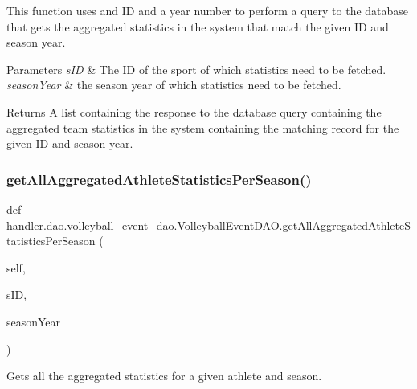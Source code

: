 This function uses and ID and a year number to perform a query to the database that gets the aggregated statistics in the system that match the given ID and season year.


\begin{DoxyParams}{Parameters}
{\em s\+ID} & The ID of the sport of which statistics need to be fetched. \\
\hline
{\em season\+Year} & the season year of which statistics need to be fetched.\\
\hline
\end{DoxyParams}
\begin{DoxyReturn}{Returns}
A list containing the response to the database query containing the aggregated team statistics in the system containing the matching record for the given ID and season year. 
\end{DoxyReturn}
\mbox{\label{classhandler_1_1dao_1_1volleyball__event__dao_1_1_volleyball_event_d_a_o_a163a639d8d5ec7cc4863c7512fea63c5}} 
\subsubsection{\texorpdfstring{get\+All\+Aggregated\+Athlete\+Statistics\+Per\+Season()}{getAllAggregatedAthleteStatisticsPerSeason()}}
{\footnotesize\ttfamily def handler.\+dao.\+volleyball\+\_\+event\+\_\+dao.\+Volleyball\+Event\+D\+A\+O.\+get\+All\+Aggregated\+Athlete\+Statistics\+Per\+Season (\begin{DoxyParamCaption}\item[{}]{self,  }\item[{}]{s\+ID,  }\item[{}]{season\+Year }\end{DoxyParamCaption})}



Gets all the aggregated statistics for a given athlete and season. 


